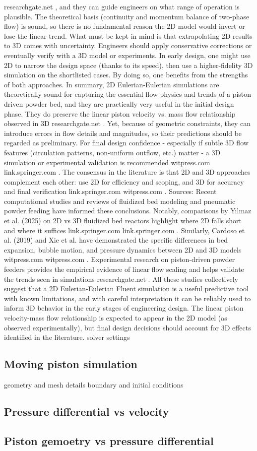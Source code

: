 researchgate.net
, and they can guide engineers on what range of operation is plausible. The theoretical basis (continuity and momentum balance of two-phase flow) is sound, so there is no fundamental reason the 2D model would invert or lose the linear trend. What must be kept in mind is that extrapolating 2D results to 3D comes with uncertainty. Engineers should apply conservative corrections or eventually verify with a 3D model or experiments. In early design, one might use 2D to narrow the design space (thanks to its speed), then use a higher-fidelity 3D simulation on the shortlisted cases. By doing so, one benefits from the strengths of both approaches. In summary, 2D Eulerian-Eulerian simulations are theoretically sound for capturing the essential flow physics and trends of a piston-driven powder bed, and they are practically very useful in the initial design phase. They do preserve the linear piston velocity vs. mass flow relationship observed in 3D
researchgate.net
. Yet, because of geometric constraints, they can introduce errors in flow details and magnitudes, so their predictions should be regarded as preliminary. For final design confidence - especially if subtle 3D flow features (circulation patterns, non-uniform outflow, etc.) matter - a 3D simulation or experimental validation is recommended
witpress.com
link.springer.com
. The consensus in the literature is that 2D and 3D approaches complement each other: use 2D for efficiency and scoping, and 3D for accuracy and final verification
link.springer.com
witpress.com
. Sources: Recent computational studies and reviews of fluidized bed modeling and pneumatic powder feeding have informed these conclusions. Notably, comparisons by Yılmaz et al. (2025) on 2D vs 3D fluidized bed reactors highlight where 2D falls short and where it suffices
link.springer.com
link.springer.com
. Similarly, Cardoso et al. (2019) and Xie et al. have demonstrated the specific differences in bed expansion, bubble motion, and pressure dynamics between 2D and 3D models
witpress.com
witpress.com
. Experimental research on piston-driven powder feeders provides the empirical evidence of linear flow scaling and helps validate the trends seen in simulations
researchgate.net
. All these studies collectively suggest that a 2D Eulerian-Eulerian Fluent simulation is a useful predictive tool with known limitations, and with careful interpretation it can be reliably used to inform 3D behavior in the early stages of engineering design. The linear piston velocity-mass flow relationship is expected to appear in the 2D model (as observed experimentally), but final design decisions should account for 3D effects identified in the literature.
solver settings
\subsection{Moving piston simulation}
geometry and mesh details
boundary and initial conditions

\newpage
\subsection{Pressure differential vs velocity}

\subsection{Piston gemoetry vs pressure differential}
